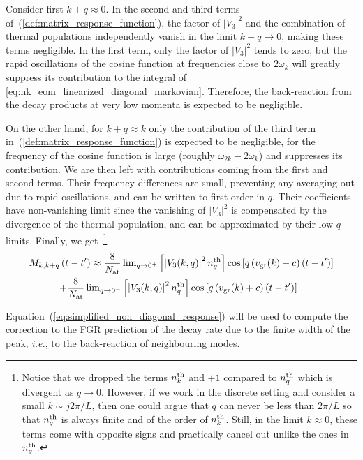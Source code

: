 \documentclass[aps,prd,notitlepage,amsfonts,amssymb,amsmath,nofootinbib,superscriptaddress,longbibliography]{revtex4-2}
\begin{document}
\begin{appendices}
Consider first $k + q \approx 0$.  In the second and third terms of~(\ref{def:matrix_response_function}), the factor of $\left| V_3 \right|^2$ and the combination of thermal populations independently vanish in the limit $k+q \to 0$, making these terms negligible. In the first term, only the factor of $\left| V_3 \right|^2$ tends to zero, but the rapid oscillations of the cosine function at frequencies close to $2\omega_{k}$ will greatly suppress its contribution to the integral of \eqref{eq:nk_eom_linearized_diagonal_markovian}. Therefore, the back-reaction from the decay products at very low momenta is expected to be negligible. 

On the other hand, for $k + q \approx k$ only the contribution of the third term in~(\ref{def:matrix_response_function}) is expected to be negligible, for the frequency of the cosine function is large (roughly $\omega_{2k} - 2\omega_{k}$) and suppresses its contribution. We are then left with contributions coming from the first and second terms.  Their frequency differences are small, preventing any averaging out due to rapid oscillations, and can be written to first order in $q$. Their coefficients have non-vanishing limit since the vanishing of $\left| V_3 \right|^2$ is compensated by the divergence of the thermal population, and can be approximated by their low-$q$ limits. Finally, we get~\footnote{Notice that we dropped the terms $n^{\rm th}_{k}$ and $+1$ compared to $n^{\rm th}_{q}$ which is divergent as $q \to 0$. However, if we work in the discrete setting and consider a small $k \sim j 2 \pi / L$, then one could argue that $q$ can never be less than $2 \pi /L$ so that $n^{\rm th}_{q}$ is always finite and of the order of $n^{\rm th}_{k}$. Still, in the limit $k \approx 0$, these terms come with opposite signs and practically cancel out unlike the ones in $n^{\rm th}_{q}$.}
\begin{multline}
    M_{k,k+q}\left(t-t^{\prime}\right) \approx \frac{8}{N_{\rm at}} 
    \, {\rm lim}_{q\to 0^{+}} \left[ \left|V_{3}(k,q)\right|^{2} n_{q}^{\rm th} \right] {\rm cos}\left[q \left(v_{\rm gr}(k)-c\right) \left(t-t^{\prime}\right) \right] \\
    + \frac{8}{N_{\rm at}} 
    \, {\rm lim}_{q\to 0^{-}} \left[ \left|V_{3}(k,q)\right|^{2} n_{q}^{\rm th} \right] {\rm cos}\left[q \left(v_{\rm gr}(k)+c\right) \left(t-t^{\prime}\right) \right] \,.
\label{eq:simplified_non_diagonal_response}
\end{multline}

Equation~(\ref{eq:simplified_non_diagonal_response}) will be used to compute the correction to the FGR prediction of the decay rate due to the finite width of the peak, {\it i.e.}, to the back-reaction of neighbouring modes.



\end{appendices}
\end{document}
